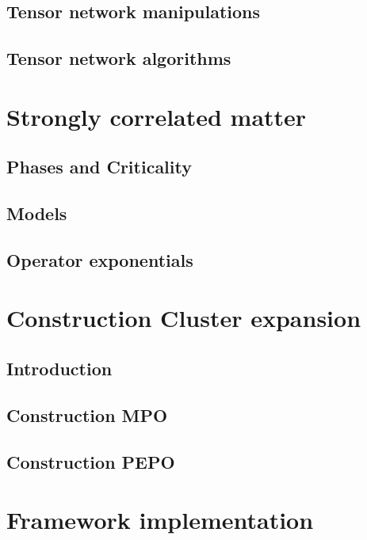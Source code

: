 \documentclass{book}
\newcounter{a}
\newcounter{b}
\begin{document}


\section{Tensor network manipulations}\label{sec:mpomath}


\section{Tensor network algorithms}


\chapter{Strongly correlated matter}

\section{Phases and Criticality} \label{sec:PhasesAndCrit}


\section{Models}


\section{Operator exponentials}


\chapter{Construction Cluster expansion}

\section{Introduction}


\section{Construction MPO}


\section{Construction PEPO}


\chapter{Framework implementation}
\end{document}
